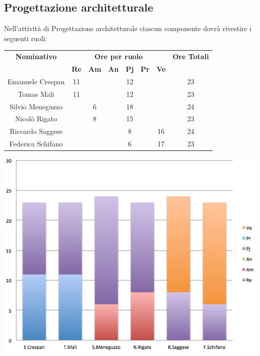 \subsection{Progettazione architetturale}
Nell’attività di Progettazione architetturale ciascun componente dovrà rivestire i seguenti ruoli:
\begin{center}
  \centering
  \begin{tabular} {|c|c|c|c|c|c|c|c|}
    \hline
    \textbf{Nominativo} & \multicolumn{6}{|c|}{\textbf{Ore per ruolo}} & \textbf{Ore Totali} \\
    & \textbf{Re} & \textbf{Am} & \textbf{An} & \textbf{Pj} & \textbf{Pr} & \textbf{Ve} & \\
    \hline
    Emanuele Crespan &11 & & &12 & & &23\\
    \hline
    Tomas Mali &11 & & &12 & & &23\\
    \hline
    Silvio Meneguzzo & &6 & &18 & & &24\\
    \hline
    Nicolò Rigato & &8 & &15 & & &23\\
    \hline
    Riccardo Saggese & & & &8 & &16 &24\\
    \hline
    Federica Schifano & & & &6 & &17 &23\\
    \hline
  \end{tabular}
  \includegraphics[scale=0.65]{img/fig3.png}
\end{center}

